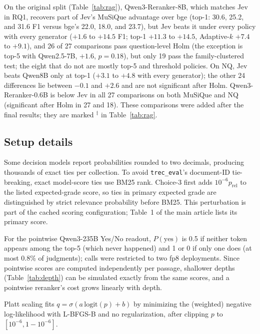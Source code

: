 On the original split (Table~\ref{tab:rag}), Qwen3-Reranker-8B, which matches Jev in RQ1, recovers part of Jev's MuSiQue advantage over bge (top-1: 30.6, 25.2, and 31.6 F1 versus bge's 22.0, 18.0, and 23.7), but Jev beats it under every policy with every generator ($+1.6$ to $+14.5$ F1; top-1 $+11.3$ to $+14.5$, Adaptive-$k$ $+7.4$ to $+9.1$), and 26 of 27 comparisons pass question-level Holm (the exception is top-5 with Qwen2.5-7B, $+1.6$, $p=0.18$), but only 19 pass the family-clustered test; the eight that do not are mostly top-5 and threshold policies. On NQ, Jev beats Qwen8B only at top-1 ($+3.1$ to $+4.8$ with every generator); the other 24 differences lie between $-0.1$ and $+2.6$ and are not significant after Holm. Qwen3-Reranker-0.6B is below Jev in all 27 comparisons on both MuSiQue and NQ (significant after Holm in 27 and 18). These comparisons were added after the final results; they are marked $^\ddagger$ in Table~\ref{tab:rag}.

\subsection{Setup details}

Some decision models report probabilities rounded to two decimals, producing thousands of exact ties per collection.
To avoid \texttt{trec\_eval}'s document-ID tie-breaking, exact model-score ties use BM25 rank. Choice-3 first adds $10^{-6}p_{\mathrm{rel}}$ to the listed expected-grade score, so ties in primary expected grade are distinguished by strict relevance probability before BM25. This perturbation is part of the cached scoring configuration; Table~1 of the main article lists its primary score.

For the pointwise Qwen3-235B Yes/No readout, $P(\text{yes})$ is 0.5 if neither token appears among the top-5 (which never happened) and 1 or 0 if only one does (at most 0.8\% of judgments); calls were restricted to two fp8 deployments. Since pointwise scores are computed independently per passage, shallower depths (Table~\ref{tab:depth}) can be simulated exactly from the same scores, and a pointwise reranker's cost grows linearly with depth.

Platt scaling fits $q=\sigma(a\,\mathrm{logit}(p)+b)$ by minimizing the (weighted) negative log-likelihood with L-BFGS-B and no regularization, after clipping $p$ to $[10^{-6},1-10^{-6}]$.

